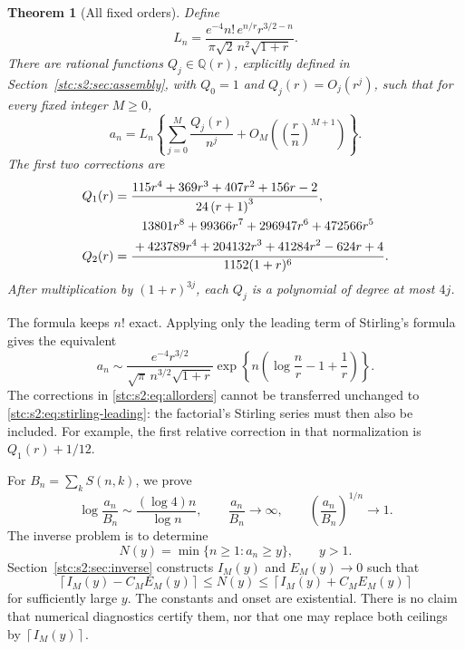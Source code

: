 \documentclass[11pt,letterpaper]{article}
\numberwithin{equation}{section}
\newtheorem{theorem}{Theorem}[section]
\theoremstyle{remark}\newtheorem{remark}[theorem]{Remark}
\newcommand{\ceil}[1]{\left\lceil #1\right\rceil}
\begin{document}
\begin{theorem}[All fixed orders]\label{stc:s2:thm:main}
Define
\begin{equation}\label{stc:s2:eq:leading}
 L_n=\frac{e^{-4}n!\,e^{n/r}r^{3/2-n}}
 {\pi\sqrt2\,n^2\sqrt{1+r}}.
\end{equation}
There are rational functions $Q_j\in\mathbb Q(r)$, explicitly defined in Section~\ref{stc:s2:sec:assembly}, with $Q_0=1$ and $Q_j(r)=O_j(r^j)$, such that for every fixed integer $M\ge0$,
\begin{equation}\label{stc:s2:eq:allorders}
 a_n=L_n\left\{\sum_{j=0}^M\frac{Q_j(r)}{n^j}
       +O_M\left(\left(\frac rn\right)^{M+1}\right)\right\}.
\end{equation}
The first two corrections are
\begin{align}
 Q_1(r)&=\frac{115 r^{4} + 369 r^{3} + 407 r^{2} + 156 r - 2}{24 \left(r + 1\right)^{3}},\label{stc:s2:eq:q1}\\
 Q_2(r)&=\frac{\begin{gathered}13801 r^{8} + 99366 r^{7} + 296947 r^{6} + 472566 r^{5}\\{}+423789 r^{4} + 204132 r^{3} + 41284 r^{2} - 624 r + 4\end{gathered}}{1152(1+r)^6}.\label{stc:s2:eq:q2}
\end{align}
After multiplication by $(1+r)^{3j}$, each $Q_j$ is a polynomial of degree at most $4j$.
\end{theorem}

The formula keeps $n!$ exact. Applying only the leading term of Stirling's formula gives the equivalent
\begin{equation}\label{stc:s2:eq:stirling-leading}
 a_n\sim\frac{e^{-4}r^{3/2}}{\sqrt\pi\,n^{3/2}\sqrt{1+r}}
 \exp\!\left\{n\left(\log\frac nr-1+\frac1r\right)\right\}.
\end{equation}
The corrections in \eqref{stc:s2:eq:allorders} cannot be transferred unchanged to \eqref{stc:s2:eq:stirling-leading}: the factorial's Stirling series must then also be included. For example, the first relative correction in that normalization is $Q_1(r)+1/12$.

For $B_n=\sum_kS(n,k)$, we prove
\begin{equation}\label{stc:s2:eq:bell-conclusion}
 \log\frac{a_n}{B_n}\sim\frac{(\log4)n}{\log n},
 \qquad \frac{a_n}{B_n}\longrightarrow\infty,
 \qquad \left(\frac{a_n}{B_n}\right)^{1/n}\longrightarrow1.
\end{equation}
The inverse problem is to determine
\begin{equation}\label{stc:s2:eq:inverse-def}
 N(y)=\min\{n\ge1:a_n\ge y\},\qquad y>1.
\end{equation}
Section~\ref{stc:s2:sec:inverse} constructs $I_M(y)$ and $E_M(y)\to0$ such that
\begin{equation}\label{stc:s2:eq:inverse-preview}
 \ceil{I_M(y)-C_ME_M(y)}\le N(y)
 \le\ceil{I_M(y)+C_ME_M(y)}
\end{equation}
for sufficiently large $y$. The constants and onset are existential. There is no claim that numerical diagnostics certify them, nor that one may replace both ceilings by $\ceil{I_M(y)}$.
\end{document}
